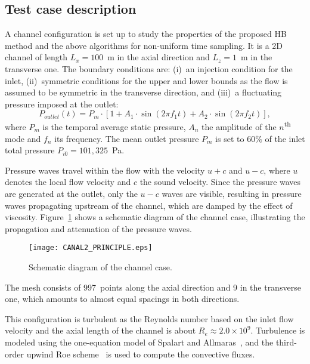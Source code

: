 \subsection{Test case description}
A channel configuration is set up to study the properties of the
proposed HB method and the above algorithms for non-uniform time
sampling.  It is a 2D channel of length $L_x = 100$~m in the axial
direction and $L_z = 1$~m in the transverse one.  The boundary
conditions are: (i)~an injection condition for the inlet,
(ii)~symmetric conditions for the upper and lower bounds as the flow
is assumed to be symmetric in the transverse direction, and (iii)~a
fluctuating pressure imposed at the outlet:
\begin{equation}
  P_{outlet}(t) = P_m \cdot \left[1 + A_1 \cdot \sin(2 \pi f_1 t) +
    A_2 \cdot \sin(2 \pi f_2 t) \right],
  \label{eq:outlet_canal}
\end{equation}
where $P_m$ is the temporal average static pressure, $A_n$ the
amplitude of the $n$\textsuperscript{th} mode and $f_n$ its
frequency. The mean outlet pressure $P_m$ is set to $60\%$ of the
inlet total pressure $P_{i0} = 101,325$~Pa.

Pressure waves travel within the flow with the velocity $u + c$ and $u
- c$, where $u$ denotes the local flow velocity and $c$ the sound
velocity. Since the pressure waves are generated at the outlet, only
the $u-c$ waves are visible, resulting in pressure waves propagating
upstream of the channel, which are damped by the effect of
viscosity. Figure~\ref{fig:canal_principle} shows a schematic diagram
of the channel case, illustrating the propagation and attenuation of
the pressure waves.
\begin{figure}[htb]
  \centering
  \texttt{[image: CANAL2\_PRINCIPLE.eps]}
  \caption{Schematic diagram of the channel case.}
  \label{fig:canal_principle}
\end{figure}

The mesh consists of 997~points along the axial direction and 9 in the
transverse one, which amounts to almost equal spacings in both
directions.


This configuration is turbulent as the Reynolds number based on the
inlet flow velocity and the axial length of the channel is about $R_e
\approx 2.0 \times 10^9$.  Turbulence is modeled using the
one-equation model of Spalart and Allmaras~\cite{Spalart1992}, and the
third-order upwind Roe scheme~\cite{Roe1981} is used to compute the
convective fluxes.

